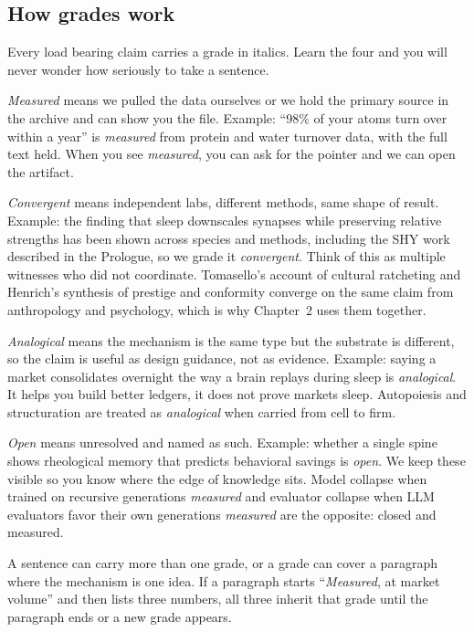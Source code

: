 \subsection*{How grades work}

Every load bearing claim carries a grade in italics. Learn the four and you will never wonder how seriously to take a sentence.

\textit{Measured} means we pulled the data ourselves or we hold the primary source in the archive and can show you the file. Example: ``98\% of your atoms turn over within a year'' is \textit{measured} from protein and water turnover data, with the full text held. When you see \textit{measured}, you can ask for the pointer and we can open the artifact.

\textit{Convergent} means independent labs, different methods, same shape of result. Example: the finding that sleep downscales synapses while preserving relative strengths has been shown across species and methods, including the SHY work \citep{baars1988,clark2016,seth2021} described in the Prologue, so we grade it \textit{convergent}. Think of this as multiple witnesses who did not coordinate. Tomasello's account of cultural ratcheting \citep{tomasello} and Henrich's synthesis of prestige and conformity \citep{henrich} converge on the same claim from anthropology and psychology, which is why Chapter~2 uses them together.

\textit{Analogical} means the mechanism is the same type but the substrate is different, so the claim is useful as design guidance, not as evidence. Example: saying a market consolidates overnight the way a brain replays during sleep is \textit{analogical}. It helps you build better ledgers, it does not prove markets sleep. Autopoiesis \citep{maturana1980} and structuration are treated as \textit{analogical} when carried from cell to firm.

\textit{Open} means unresolved and named as such. Example: whether a single spine shows rheological memory that predicts behavioral savings is \textit{open}. We keep these visible so you know where the edge of knowledge sits. Model collapse when trained on recursive generations \textit{measured} \citep{shumailov2024} and evaluator collapse when LLM evaluators favor their own generations \textit{measured} \citep{panickssery2024} are the opposite: closed and measured.

A sentence can carry more than one grade, or a grade can cover a paragraph where the mechanism is one idea. If a paragraph starts ``\textit{Measured}, at market volume'' and then lists three numbers, all three inherit that grade until the paragraph ends or a new grade appears.

